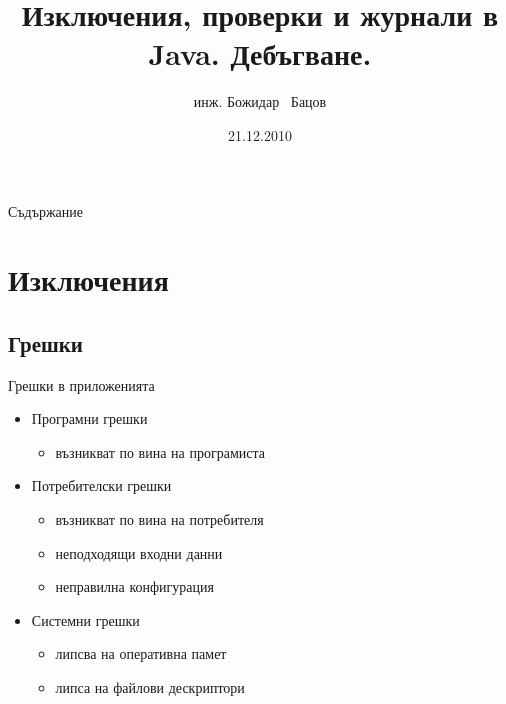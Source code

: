 \documentclass{beamer}
\title{Изключения, проверки и журнали в Java. Дебъгване.}
\author{инж. Божидар ~Бацов}
\institute{Drow Ltd.}
\date{21.12.2010}
\begin{document}
\begin{frame}
  \titlepage
\end{frame}

\begin{frame}{Съдържание}
  \transdissolve
  \tableofcontents[pausesections]
\end{frame}

\section{Изключения}

\subsection{Грешки}

\begin{frame}{Грешки в приложенията}
  \transdissolve
  \begin{itemize}
  \item Програмни грешки \pause
    \begin{itemize}
      \item възникват по вина на програмиста \pause
    \end{itemize}
  \item Потребителски грешки \pause
      \begin{itemize}
        \item възникват по вина на потребителя \pause
        \item неподходящи входни данни \pause
        \item неправилна конфигурация \pause
      \end{itemize}
  \item Системни грешки \pause
  \begin{itemize}
    \item липсва на оперативна памет \pause
    \item липса на файлови дескриптори \pause
  \end{itemize}
  \end{itemize}
\end{frame}
\end{document}
